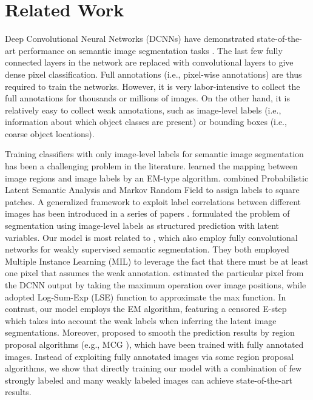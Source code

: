 \section{Related Work}
Deep Convolutional Neural Networks (DCNNs) have demonstrated state-of-the-art performance on semantic image segmentation tasks \citep{chen2014semantic, eigen2014predicting, long2014fully}. The last few fully connected layers in the network are replaced with convolutional layers \citep{papandreou2014untangling} to give dense pixel classification. Full annotations (i.e., pixel-wise annotations) are thus required to train the networks. However, it is very labor-intensive to collect the full annotations for thousands or millions of images. On the other hand, it is relatively easy to collect weak annotations, such as image-level labels (i.e., information about which object classes are present) or bounding boxes (i.e., coarse object locations).

Training classifiers with only image-level labels for semantic image segmentation has been a challenging problem in the literature. \citet{duygulu2002object} learned the mapping between image regions and image labels by an EM-type algorithm. \citet{verbeek2007region} combined Probabilistic Latent Semantic Analysis and Markov Random Field to assign labels to square patches. A generalized framework to exploit label correlations between different images has been introduced in a series of papers \citep{vezhnevets2010towards, vezhnevets2011weakly, vezhnevets2012weakly}. \citet{xu2014tell} formulated the problem of segmentation using image-level labels as structured prediction with latent variables. Our model is most related to \citet{pathak2014fully, pinheiro2014weakly}, which also employ fully convolutional networks for weakly supervised semantic segmentation. They both employed Multiple Instance Learning (MIL) to leverage the fact that there must be at least one pixel that assumes the weak annotation. \citet{pathak2014fully} estimated the particular pixel from the DCNN output by taking the maximum operation over image positions, while \citet{pinheiro2014weakly} adopted Log-Sum-Exp (LSE) function to approximate the max function. In contrast, our model employs the EM algorithm, featuring a censored E-step which takes into account the weak labels when inferring the latent image segmentations. Moreover, \citet{pinheiro2014weakly} proposed to smooth the prediction results by region proposal algorithms (e.g., MCG \citep{arbelaez2014multiscale}), which have been trained with fully annotated images. Instead of exploiting fully annotated images via some region proposal algorithms, we show that directly training our model with a combination of few strongly labeled and many weakly labeled images can achieve state-of-the-art results.

